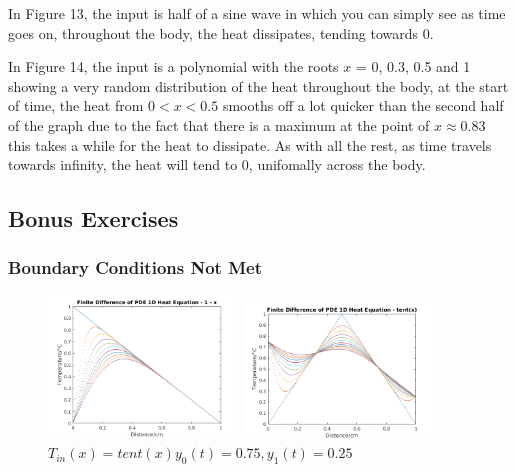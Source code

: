 \documentclass[11pt,a4paper]{article}
\begin{document}
In Figure 13, the input is half of a sine wave in which you can simply see as time goes on, throughout the body, the heat dissipates, tending towards 0.

\vspace{4mm}In Figure 14, the input is a polynomial with the roots $x$ = 0, 0.3, 0.5 and 1 showing a very random distribution of the heat throughout the body, at the start of time, the heat from $0 < x < 0.5$ smooths off a lot quicker than  the second half of the graph due to the fact that there is a maximum at the point of $x \approx 0.83$ this takes a while for the heat to dissipate. As with all the rest, as time travels towards infinity, the heat will tend to 0, unifomally across the body.

\vspace{40mm}
\subsection{Bonus Exercises}
\subsubsection{Boundary Conditions Not Met}

\begin{figure}
	\vspace{-10mm}
	\includegraphics[width=0.45\textwidth]{Ex4_Figs/1-xbcdiff.png}
	\vspace{-3mm}
	\caption{$T_{in}(x)= 1-x$}
	\label{fig:bcnm}
		\includegraphics[width=0.45\textwidth]{Ex4_Figs/Tentbc.png}
		\vspace{-3mm}
	\caption{$T_{in}(x)= tent(x)  y_0(t) = 0.75, y_1(t) = 0.25$}
	\label{fig:bmsn2}
\end{figure}
\end{document}
